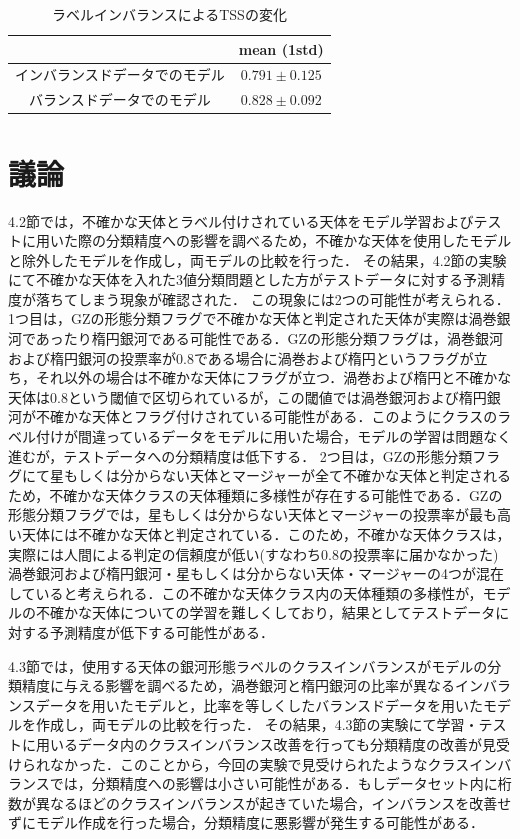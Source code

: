 \documentclass[a4j, 11pt]{jreport}
\begin{document}
\begin{table}[H]
  \centering
	\caption{ラベルインバランスによるTSSの変化}
  \begin{tabular}{|c|c|}
		\hline
    & mean (1std) \\ \hline
    インバランスドデータでのモデル & $0.791 \pm 0.125$ \\ \hline
    バランスドデータでのモデル & $0.828 \pm 0.092$ \\ \hline
  \end{tabular}
  \label{tb:TSS_4.3}
\end{table}

\newpage
\section{議論}
4.2節では，不確かな天体とラベル付けされている天体をモデル学習およびテストに用いた際の分類精度への影響を調べるため，不確かな天体を使用したモデルと除外したモデルを作成し，両モデルの比較を行った．
その結果，4.2節の実験にて不確かな天体を入れた3値分類問題とした方がテストデータに対する予測精度が落ちてしまう現象が確認された．
この現象には2つの可能性が考えられる．1つ目は，GZの形態分類フラグで不確かな天体と判定された天体が実際は渦巻銀河であったり楕円銀河である可能性である．GZの形態分類フラグは，渦巻銀河および楕円銀河の投票率が0.8である場合に渦巻および楕円というフラグが立ち，それ以外の場合は不確かな天体にフラグが立つ．渦巻および楕円と不確かな天体は0.8という閾値で区切られているが，この閾値では渦巻銀河および楕円銀河が不確かな天体とフラグ付けされている可能性がある．このようにクラスのラベル付けが間違っているデータをモデルに用いた場合，モデルの学習は問題なく進むが，テストデータへの分類精度は低下する．
2つ目は，GZの形態分類フラグにて星もしくは分からない天体とマージャーが全て不確かな天体と判定されるため，不確かな天体クラスの天体種類に多様性が存在する可能性である．GZの形態分類フラグでは，星もしくは分からない天体とマージャーの投票率が最も高い天体には不確かな天体と判定されている．このため，不確かな天体クラスは，実際には人間による判定の信頼度が低い(すなわち0.8の投票率に届かなかった)渦巻銀河および楕円銀河・星もしくは分からない天体・マージャーの4つが混在していると考えられる．この不確かな天体クラス内の天体種類の多様性が，モデルの不確かな天体についての学習を難しくしており，結果としてテストデータに対する予測精度が低下する可能性がある．


4.3節では，使用する天体の銀河形態ラベルのクラスインバランスがモデルの分類精度に与える影響を調べるため，渦巻銀河と楕円銀河の比率が異なるインバランスデータを用いたモデルと，比率を等しくしたバランスドデータを用いたモデルを作成し，両モデルの比較を行った．
その結果，4.3節の実験にて学習・テストに用いるデータ内のクラスインバランス改善を行っても分類精度の改善が見受けられなかった．このことから，今回の実験で見受けられたようなクラスインバランスでは，分類精度への影響は小さい可能性がある．もしデータセット内に桁数が異なるほどのクラスインバランスが起きていた場合，インバランスを改善せずにモデル作成を行った場合，分類精度に悪影響が発生する可能性がある．
\end{document}
